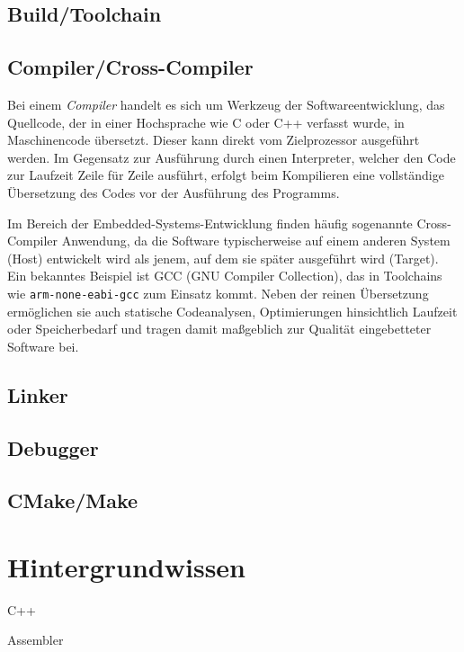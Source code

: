 \subsection*{Build/Toolchain}

\subsection*{Compiler/Cross-Compiler}
Bei einem \emph{Compiler} handelt es sich um Werkzeug der Softwareentwicklung, das Quellcode, der in einer Hochsprache wie C oder C++ verfasst wurde, in Maschinencode übersetzt. 
Dieser kann direkt vom Zielprozessor ausgeführt werden. Im Gegensatz zur Ausführung durch einen Interpreter, welcher den Code zur Laufzeit Zeile für Zeile ausführt, erfolgt beim Kompilieren eine vollständige Übersetzung des Codes vor der Ausführung des Programms.

Im Bereich der Embedded-Systems-Entwicklung finden häufig sogenannte Cross-Compiler Anwendung, da die Software typischerweise auf einem anderen System (Host) entwickelt wird als jenem, auf dem sie später ausgeführt wird (Target).
Ein bekanntes Beispiel ist GCC (GNU Compiler Collection), das in Toolchains wie \texttt{arm-none-eabi-gcc} zum Einsatz kommt.
Neben der reinen Übersetzung ermöglichen sie auch statische Codeanalysen, Optimierungen hinsichtlich Laufzeit oder Speicherbedarf und tragen damit maßgeblich zur Qualität eingebetteter Software bei.

\subsection*{Linker}

\subsection*{Debugger}

\subsection*{CMake/Make}


\section{Hintergrundwissen}
C++

Assembler































